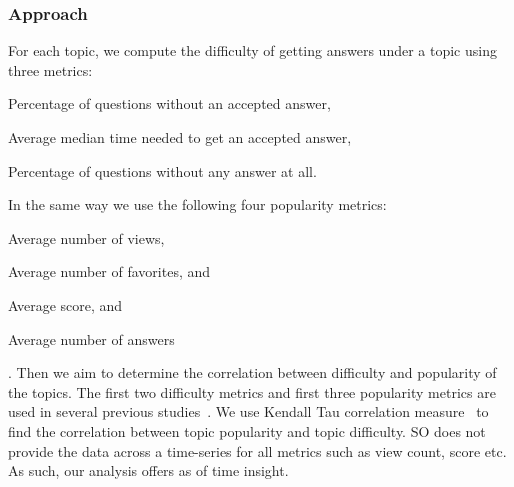 \subsubsection{Approach} For each topic, we compute the difficulty of getting answers under a topic using three metrics: \begin{inparaenum}[(1)] \item Percentage of questions without an accepted answer,
\item Average median time needed to get an accepted answer,
\item Percentage of questions without any answer at all.
\end{inparaenum} In the same way we use the following four popularity metrics: \begin{inparaenum}[(1)]
\item Average number of views, \item Average number of favorites, and \item Average
score, and \item Average number of answers \end{inparaenum}. Then we aim to determine the correlation between difficulty and
popularity of the topics. The first two difficulty metrics and first three popularity metrics are used in several previous studies~\cite{bagherzadeh2019going, abdellatif2020challenges, ahmed2018concurrency}. We use Kendall Tau correlation measure~\cite{Kendall-TauMetric-Biometrica1938} to
find the correlation between topic popularity and topic difficulty. SO does not
provide the data across a time-series for all metrics such as view count, score etc. As such, our analysis offers as of time insight. 


